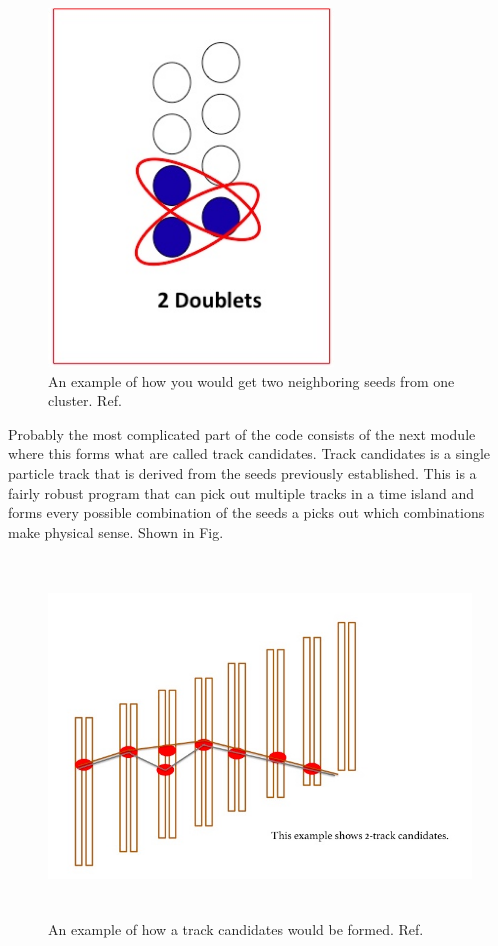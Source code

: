 \documentclass[./Thesis]{subfiles}
\begin{document}
\begin{figure}
	\centerline{\includegraphics[height=95mm]{doubleseed.jpeg}}
	\caption[Double Seed]{ An example of how you would get two neighboring seeds from one cluster.  Ref. \cite{trackerWiki}
	}
	\label{fig:doubleseed}
\end{figure} 
	
	Probably the most complicated part of the code consists of the next module where this forms what are called track candidates. Track candidates is a single particle track that is derived from the seeds previously established. This is a fairly robust program that can pick out multiple tracks in a time island and forms every possible combination of the seeds a picks out which combinations make physical sense. Shown in Fig. %
	
\begin{figure}
	\centerline{\includegraphics[height=95mm]{trackcandidate.jpeg}}
	\caption[Track Candidate]{ An example of how a track candidates would be formed.  Ref. \cite{trackerWiki}
	}
	\label{fig:trackcandidate}
\end{figure} 
	
\end{document}
